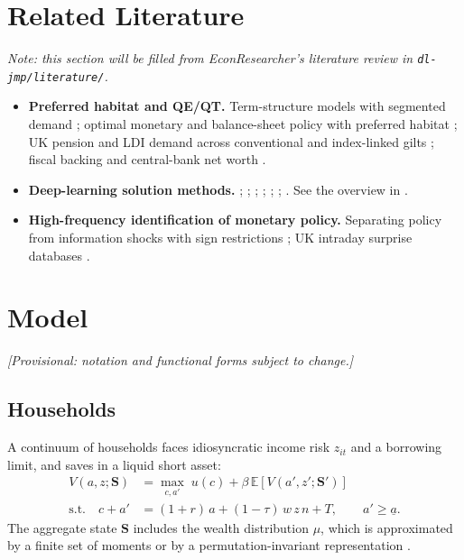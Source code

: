 \documentclass[11pt,a4paper]{article}
\newcommand{\provisional}{\textit{[Provisional: notation and functional forms subject to change.]}}
\begin{document}
\section{Related Literature}
\noindent\textit{Note: this section will be filled from EconResearcher's literature review in \texttt{dl-jmp/literature/}.}
\begin{itemize}
  \item \textbf{Preferred habitat and QE/QT.} Term-structure models with segmented demand \citep{VayanosVila2021}; optimal monetary and balance-sheet policy with preferred habitat \citep{KamdarRay2026}; UK pension and LDI demand across conventional and index-linked gilts \citep{ChenBeetsmaVanWijnbergen}; fiscal backing and central-bank net worth \citep{GrodeckaMessiKliemMuller}.
  \item \textbf{Deep-learning solution methods.} \citet{MaliarMaliarWinant2021}; \citet{AzinovicGaegaufScheidegger2022}; \citet{FernandezVillaverdeHurtadoNuno2023}; \citet{EbrahimiKahou2021, EbrahimiKahou2024}; \citet{Kase2024}; \citet{Nuno2024}; \citet{Duarte2024}. See the overview in \citet{FVDeckHarvard}.
  \item \textbf{High-frequency identification of monetary policy.} Separating policy from information shocks with sign restrictions \citep{JarocinskiKaradi2020}; UK intraday surprise databases \citep{BraunMirandaAgrippinoSaha}.
\end{itemize}

\section{Model}
\provisional

\subsection{Households}
A continuum of households faces idiosyncratic income risk $z_{it}$ and a borrowing limit, and saves in a liquid short asset:
\begin{align}
  V(a,z;\mathbf{S}) &= \max_{c,a'}\; u(c) + \beta\,\mathbb{E}\left[V(a',z';\mathbf{S}')\right] \\
  \text{s.t.}\quad c + a' &= (1+r)\,a + (1-\tau)\,w\,z\,n + T, \qquad a' \ge \underline{a}.
\end{align}
The aggregate state $\mathbf{S}$ includes the wealth distribution $\mu$, which is approximated by a finite set of moments or by a permutation-invariant representation \citep{EbrahimiKahou2021}.
\end{document}

